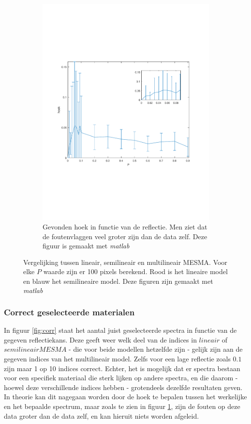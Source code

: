 \documentclass[12pt]{report}
\begin{document}
\begin{figure}
\begin{subfigure}[b]{0.5\textwidth}
\includegraphics[width=\textwidth,trim=0 200 0 175 cm]{PMC_10_100_angle.pdf}
\caption{Gevonden hoek in functie van de reflectie. Men ziet dat de foutenvlaggen veel groter zijn dan de data zelf. Deze figuur is gemaakt met \textit{matlab}\cite{matlab} \label{fig:hoek}}
\end{subfigure}
\caption{Vergelijking tussen lineair, semilineair en multilineair MESMA. Voor elke $P$ waarde zijn er 100 pixels berekend. Rood is het lineaire model en blauw het semilineaire model. Deze figuren zijn gemaakt met \textit{matlab}\cite{matlab}\label{fig:e100}}
\end{figure}

\subsubsection{Correct geselecteerde materialen}

In figuur \ref{fig:corr} staat het aantal juist geselecteerde spectra in functie van de gegeven reflectiekans. Deze geeft weer welk deel van de indices in $lineair$ of $semilineair MESMA$ - die voor beide modellen hetzelfde zijn - gelijk zijn aan de gegeven indices van het multilineair model. Zelfs voor een lage reflectie zoals $0.1$ zijn maar 1 op 10 indices correct. Echter, het is mogelijk dat er spectra bestaan voor een specifiek materiaal die sterk lijken op andere spectra, en die daarom - hoewel deze verschillende indices hebben - grotendeels dezelfde resultaten geven. In theorie kan dit nagegaan worden door de hoek te bepalen tussen het werkelijke en het bepaalde spectrum, maar zoals te zien in figuur \ref{fig:hoek}, zijn de fouten op deze data groter dan de data zelf, en kan hieruit niets worden afgeleid. 
\end{document}
